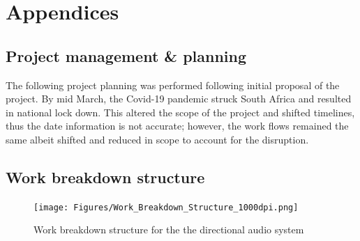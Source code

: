 \section{Appendices}
\begin{appendices}
\section{Project management \& planning}
The following project planning was performed following initial proposal of the project. By mid March, the Covid-19 pandemic struck South Africa and resulted in national lock down. This altered the scope of the project and shifted timelines, thus the date information is not accurate; however, the work flows remained the same albeit shifted and reduced in scope to account for the disruption.
\subsection{Work breakdown structure}
\begin{figure}[h]
    \centering
    \texttt{[image: Figures/Work\_Breakdown\_Structure\_1000dpi.png]}
    \caption{Work breakdown structure for the the directional audio system}
    \label{fig:wbs}
\end{figure}

\end{appendices}
